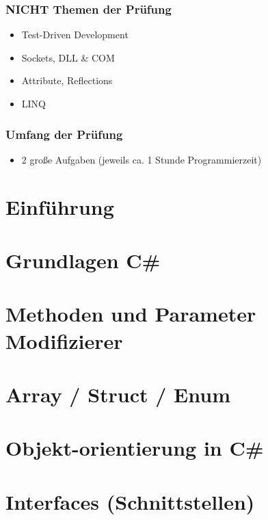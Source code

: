 \documentclass{scrreprt}
\begin{document}
\subsection*{NICHT Themen der Prüfung}
\begin{itemize}
\item Test-Driven Development
\item Sockets, DLL \& COM
\item Attribute, Reflections
\item LINQ
\end{itemize}

\subsection*{Umfang der Prüfung}
\begin{itemize}
\item 2 große Aufgaben (jeweils ca. 1 Stunde Programmierzeit)
\end{itemize}

\chapter{Einführung}


\chapter{Grundlagen C\#}


\chapter{Methoden und Parameter Modifizierer}


\chapter{Array / Struct / Enum}

 
\chapter{Objekt-orientierung in C\#}


\chapter{Interfaces (Schnittstellen)}

\end{document}
